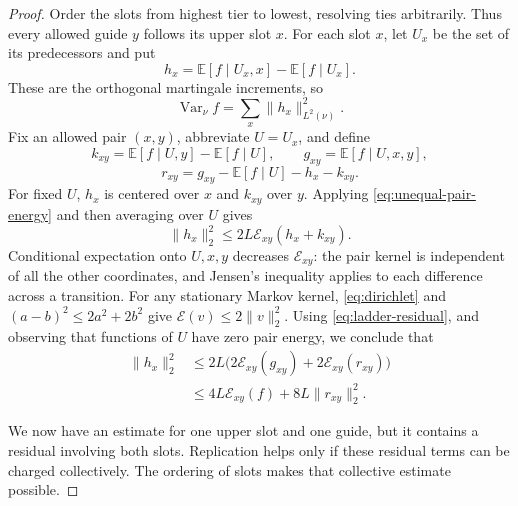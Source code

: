 \documentclass[11pt]{article}
\theoremstyle{definition}
\theoremstyle{remark}
\newcommand{\E}{\mathbb E}
\DeclareMathOperator{\Var}{Var}
\newcommand{\calE}{\mathcal E}
\numberwithin{equation}{section}
\begin{document}
\begin{proof}
Order the slots from highest tier to lowest, resolving ties
arbitrarily. Thus every allowed guide $y$ follows its upper slot $x$.
For each slot $x$, let $U_x$ be the set of its predecessors and put
\[
 h_x=\E[f\mid U_x,x]-\E[f\mid U_x].
\]
These are the orthogonal martingale increments, so
\begin{equation}\label{eq:ladder-martingale}
 \Var_\nu f=\sum_x\|h_x\|_{L^2(\nu)}^2.
\end{equation}
Fix an allowed pair $(x,y)$, abbreviate $U=U_x$, and define
\[
 k_{xy}=\E[f\mid U,y]-\E[f\mid U],\qquad
 g_{xy}=\E[f\mid U,x,y],
\]
\begin{equation}\label{eq:ladder-residual}
 r_{xy}=g_{xy}-\E[f\mid U]-h_x-k_{xy}.
\end{equation}
For fixed $U$, $h_x$ is centered over $x$ and $k_{xy}$ over $y$.
Applying \cref{eq:unequal-pair-energy} and then averaging over $U$
gives
\[
 \|h_x\|_2^2\le2L\calE_{xy}(h_x+k_{xy}).
\]
Conditional expectation onto $U,x,y$ decreases $\calE_{xy}$: the
pair kernel is independent of all the other coordinates, and Jensen's
inequality applies to each difference across a transition.
For any stationary Markov kernel, \cref{eq:dirichlet} and
$(a-b)^2\le2a^2+2b^2$ give $\calE(v)\le2\|v\|_2^2$.
Using \cref{eq:ladder-residual}, and observing that functions of $U$
have zero pair energy, we conclude that
\begin{align}
 \|h_x\|_2^2
 &\le 2L\bigl(2\calE_{xy}(g_{xy})+2\calE_{xy}(r_{xy})\bigr)
 \nonumber\\
 &\le4L\calE_{xy}(f)+8L\|r_{xy}\|_2^2.
 \label{eq:ladder-one-pair}
\end{align}

We now have an estimate for one upper slot and one guide, but it
contains a residual involving both slots. Replication helps only if
these residual terms can be charged collectively. The ordering of
slots makes that collective estimate possible.


\end{proof}
\end{document}
